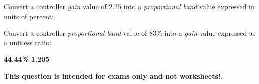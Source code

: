 

Convert a controller {\it gain} value of 2.25 into a {\it proportional band} value expressed in units of percent:

\vskip 20pt

Convert a controller {\it proportional band} value of 83\% into a {\it gain} value expressed as a unitless ratio:







{\bf 44.44\%} \hskip 30pt {\bf 1.205}







{\bf This question is intended for exams only and not worksheets!}.


